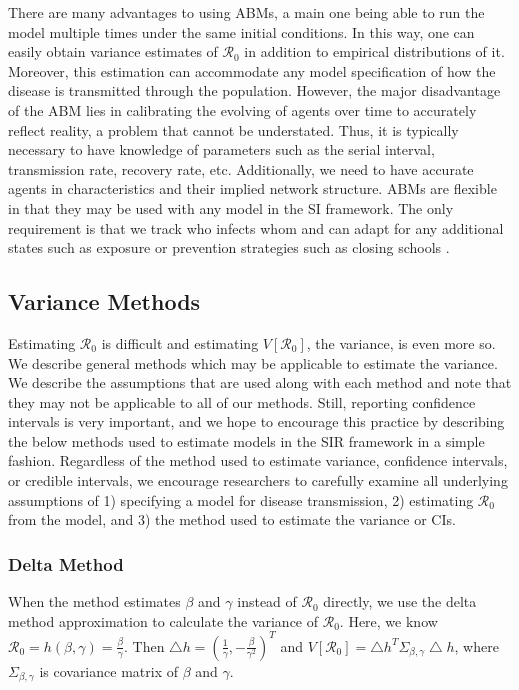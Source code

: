 \documentclass[12pt]{article}
\newcommand{\rr}{\ensuremath{\mathcal{R}_0}}
\begin{document}
There are many advantages to using ABMs, a main one being able to run the model multiple times under the same initial conditions.  In this way, one can easily obtain variance estimates of $\rr$ in addition to empirical distributions of it.  Moreover, this estimation can accommodate any model specification of how the disease is transmitted through the population.  However, the major disadvantage of the ABM lies in calibrating the evolving of agents over time to accurately reflect reality, a problem that cannot be understated.  Thus, it is typically necessary to have knowledge of parameters such as the serial interval, transmission rate, recovery rate, etc.  Additionally, we need to have accurate agents in characteristics and their implied network structure.  ABMs are flexible in that they may be used with any model in the SI framework.  The only requirement is that we track who infects whom and can adapt for any additional states such as exposure or prevention strategies such as closing schools \citep{fred}.







\subsection{Variance Methods}
\label{sec:methods}

Estimating $\rr$ is difficult and estimating $V[\rr]$, the variance, is even more so.  We describe general methods which may be applicable to estimate the variance.  We describe the assumptions that are used along with each method and note that they may not be applicable to all of our methods.  Still, reporting confidence intervals is very important, and we hope to encourage this practice by describing the below methods used to estimate models in the SIR framework in a simple fashion.  Regardless of the method used to estimate variance, confidence intervals, or credible intervals, we encourage researchers to carefully examine all underlying assumptions of 1) specifying a model for disease transmission, 2) estimating $\rr$ from the model, and 3) the method used to estimate the variance or CIs.


\subsubsection{Delta Method}\label{delta-method}

When the method estimates \(\beta\) and \(\gamma\) instead of \(\rr\) directly, we use the delta method approximation to calculate the
variance of \(\rr\). Here, we know \(\rr = h(\beta, \gamma) = \frac{\beta}{\gamma}\). Then \(\bigtriangleup h = (\frac{1}{\gamma},  -\frac{\beta}{\gamma^2})^T\) and \(V[\rr] = \bigtriangleup h^T \Sigma_{\beta, \gamma} \bigtriangleup h\), where \(\Sigma_{\beta, \gamma}\) is covariance matrix of \(\beta\) and \(\gamma\).
\end{document}
